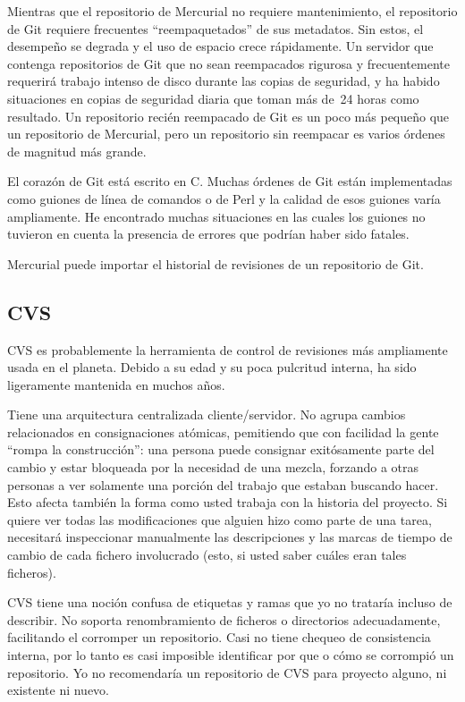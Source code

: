 Mientras que el repositorio de Mercurial no requiere mantenimiento, el
repositorio de Git requiere frecuentes ``reempaquetados'' de sus metadatos.
Sin estos, el desempeño se degrada y el uso de espacio crece rápidamente. Un
servidor que contenga repositorios de Git que no sean reempacados
rigurosa y frecuentemente requerirá trabajo intenso de disco durante
las copias de seguridad, y ha habido situaciones en copias de
seguridad diaria que toman más de~24 horas como resultado. Un
repositorio recién reempacado de Git es un poco más pequeño que un
repositorio de Mercurial, pero un repositorio sin reempacar es varios
órdenes de magnitud más grande.

El corazón de Git está escrito en C.  Muchas órdenes de Git están
implementadas como guiones de línea de comandos o de Perl y la calidad de esos
guiones varía ampliamente. He encontrado muchas situaciones en las
cuales los guiones no tuvieron en cuenta la presencia de errores que
podrían haber sido fatales.

Mercurial puede importar el historial de revisiones de un repositorio
de Git.

\subsection{CVS}

CVS es probablemente la herramienta de control de revisiones más
ampliamente usada en el planeta.  Debido a su edad y su poca pulcritud
interna, ha sido ligeramente mantenida en muchos años.

Tiene una arquitectura centralizada cliente/servidor. No agrupa
cambios relacionados en consignaciones atómicas, pemitiendo que con
facilidad la gente ``rompa la construcción'': una persona puede
consignar exitósamente parte del cambio y estar bloqueada por la
necesidad de una mezcla, forzando a otras personas a ver solamente una
porción del trabajo que estaban buscando hacer.  Esto afecta también
la forma como usted trabaja con la historia del proyecto. Si quiere
ver todas las modificaciones que alguien hizo como parte de una tarea,
necesitará inspeccionar manualmente las descripciones y las marcas de
tiempo de cambio de cada fichero involucrado (esto, si usted saber
cuáles eran tales ficheros).

CVS tiene una noción confusa de etiquetas y ramas que yo no trataría
incluso de describir.  No soporta renombramiento de ficheros o
directorios adecuadamente, facilitando el corromper un
repositorio. Casi no tiene chequeo de consistencia interna, por lo
tanto es casi imposible identificar por que o cómo se corrompió un
repositorio. Yo no recomendaría un repositorio de CVS para proyecto
alguno, ni existente ni nuevo.

